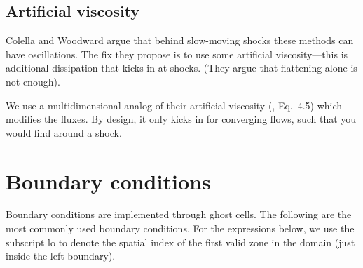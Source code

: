 \subsection{Artificial viscosity}

Colella and Woodward argue that behind slow-moving shocks these
methods can have oscillations.  The fix they propose is to use some
artificial viscosity---this is additional dissipation that kicks in at
shocks.  (They argue that flattening alone is not enough).

We use a multidimensional analog of their artificial viscosity
(\cite{colellawoodward:1984}, Eq.\ 4.5) which modifies the fluxes.  By
design, it only kicks in for converging flows, such that you would
find around a shock.


\section{Boundary conditions}

Boundary conditions are implemented through ghost cells.  The following
are the most commonly used boundary conditions.  For the expressions
below, we use the subscript $\mathrm{lo}$ to denote the spatial index
of the first valid zone in the domain (just inside the left boundary).

